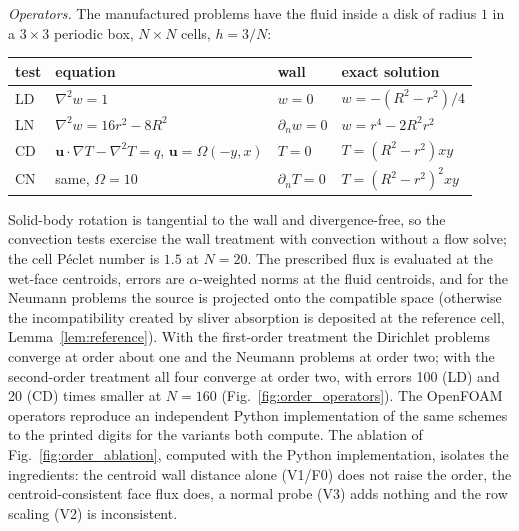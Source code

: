 \documentclass[11pt,a4paper]{article}
\theoremstyle{remark}
\newcommand{\uu}{\bm{u}}
\begin{document}
\emph{Operators.} The manufactured problems have the fluid inside a disk of radius $1$ in a
$3\times3$ periodic box, $N\times N$ cells, $h=3/N$:
\begin{center}\small
\begin{tabular}{@{}llll@{}}
\toprule
test & equation & wall & exact solution\\
\midrule
LD & $\nabla^2w=1$ & $w=0$ & $w=-(R^2-r^2)/4$\\
LN & $\nabla^2w=16r^2-8R^2$ & $\partial_nw=0$ & $w=r^4-2R^2r^2$\\
CD & $\uu\cdot\nabla T-\nabla^2T=q$, $\uu=\Omega(-y,x)$ & $T=0$ & $T=(R^2-r^2)xy$\\
CN & same, $\Omega=10$ & $\partial_nT=0$ & $T=(R^2-r^2)^2xy$\\
\bottomrule
\end{tabular}
\end{center}
Solid-body rotation is tangential to the wall and divergence-free, so the convection tests
exercise the wall treatment with convection without a flow solve; the cell P\'eclet number is
$1.5$ at $N=20$. The prescribed flux is evaluated at the wet-face centroids, errors are
$\alpha$-weighted norms at the fluid centroids, and for the Neumann problems the source is
projected onto the compatible space (otherwise the incompatibility created by sliver
absorption is deposited at the reference cell, Lemma~\ref{lem:reference}). With the first-order
treatment the Dirichlet problems converge at order about one and the Neumann problems at order
two; with the second-order treatment all four converge at order two, with errors 100 (LD) and
20 (CD) times smaller at $N=160$ (Fig.~\ref{fig:order_operators}). The OpenFOAM operators
reproduce an independent Python implementation of the same schemes to the printed digits for
the variants both compute. The
ablation of Fig.~\ref{fig:order_ablation}, computed with the Python implementation, isolates the
ingredients: the centroid wall distance alone (V1/F0) does not raise the order, the
centroid-consistent face flux does, a normal probe (V3) adds nothing and the row scaling (V2) is
inconsistent.
\end{document}
